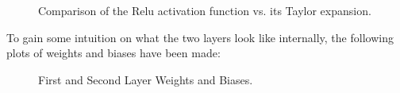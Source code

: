 \begin{figure}[H]
  \centering
  \caption[Comparison of the Relu activation function vs. its Taylor expansion]{Comparison of the Relu activation function vs. its Taylor expansion.}
  \label{fig:taylor-relu}
\end{figure}

To gain some intuition on what the two layers look like internally, the following plots of weights and biases have been made:
\begin{figure}[H]
  \centering
  \caption[Weights and biases of our neural network]{First and Second Layer Weights and Biases.}
  \label{fig:layer-1-and-2}
\end{figure}

